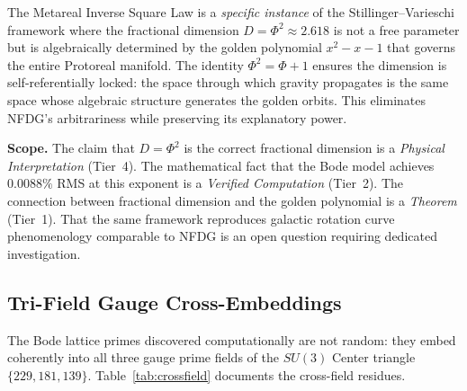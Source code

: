 The Metareal Inverse Square Law is a \emph{specific instance} of the Stillinger--Varieschi framework where the fractional dimension $D = \Phi^2 \approx 2.618$ is not a free parameter but is algebraically determined by the golden polynomial $x^2 - x - 1$ that governs the entire Protoreal manifold. The identity $\Phi^2 = \Phi + 1$ ensures the dimension is self-referentially locked: the space through which gravity propagates is the same space whose algebraic structure generates the golden orbits. This eliminates NFDG's arbitrariness while preserving its explanatory power.

\textbf{Scope.} The claim that $D = \Phi^2$ is the correct fractional dimension is a \emph{Physical Interpretation} (Tier~4). The mathematical fact that the Bode model achieves $0.0088\%$ RMS at this exponent is a \emph{Verified Computation} (Tier~2). The connection between fractional dimension and the golden polynomial is a \emph{Theorem} (Tier~1). That the same framework reproduces galactic rotation curve phenomenology comparable to NFDG is an open question requiring dedicated investigation.

\subsection{Tri-Field Gauge Cross-Embeddings}
The Bode lattice primes discovered computationally are not random: they embed coherently into all three gauge prime fields of the $SU(3)$ Center triangle $\{229, 181, 139\}$. Table~\ref{tab:crossfield} documents the cross-field residues.

